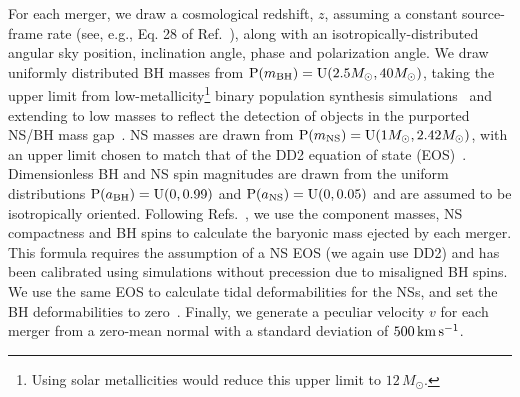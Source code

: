 \documentclass[%
 reprint,
 superscriptaddress,
 nofootinbib,
 amsmath,amssymb,
 aps,
]{revtex4-2}
\newcommand{\msun}{M_\odot}
\newcommand{\prob}{\ensuremath{{\rm P}}}
\newcommand{\abh}{a_{\rm BH}}
\newcommand{\ans}{a_{\rm NS}}
\newcommand{\mbh}{m_{\rm BH}}
\newcommand{\mns}{m_{\rm NS}}
\newcommand{\uniform}{{\rm U}}
\newcommand{\kms}{\ensuremath{{\rm km\,s^{-1}}}}
\begin{document}
For each merger, we draw a cosmological redshift, $z$, assuming a constant source-frame rate (see, e.g., Eq. 28 of Ref.~\cite{Mortlock_etal:2019}), along with an isotropically-distributed angular sky position, inclination angle, phase and polarization angle. We draw uniformly distributed BH masses from $\prob(\mbh) = \uniform(2.5\msun, 40\msun)$, taking the upper limit from low-metallicity\footnote{Using solar metallicities would reduce this upper limit to $12\,\msun$.} binary population synthesis simulations~\cite{Kruckow_etal:2018} and extending to low masses to reflect the detection of objects in the purported NS/BH mass gap~\cite{LVC:2020O3acat}. NS masses are drawn from $\prob(\mns) = \uniform(1\msun, 2.42\msun)$, with an upper limit chosen to match that of the DD2 equation of state (EOS)~\cite{Typel_etal:2010,*Hempel_etal:2010,*Fischer_etal:2014}. Dimensionless BH and NS spin magnitudes are drawn from the uniform distributions $\prob(\abh) = \uniform(0, 0.99)$ and $\prob(\ans) = \uniform(0, 0.05)$ and are assumed to be isotropically oriented. Following Refs.~\cite{Foucart:2012,Foucart_etal:2018}, we use the component masses, NS compactness and BH spins to calculate the baryonic mass ejected by each merger. This formula requires the assumption of a NS EOS (we again use DD2) and has been calibrated using simulations without precession due to misaligned BH spins. We use the same EOS to calculate tidal deformabilities for the NSs, and set the BH deformabilities to zero~\cite{Binnington_Poisson:2009,*Pani_etal:2015,*Cardoso_etal:2017,*Chia:2020}. Finally, we generate a peculiar velocity $v$ for each merger from a zero-mean normal with a standard deviation of $500\,\kms$.
\end{document}
